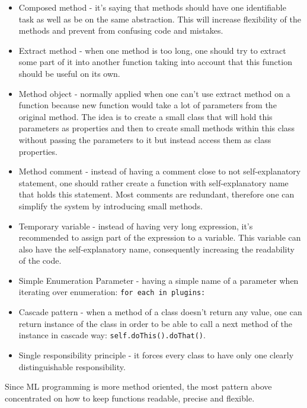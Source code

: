 {%
\begin{itemize}
	\item Composed method - it's saying that methods should
		have one identifiable task as well as be on the same abstraction.
		This will increase flexibility of the methods and prevent
		from confusing code and mistakes. \cite{beck1997smalltalk}
	\item Extract method - when one method is too long, one should try to
		extract some part of it into another function taking into account that this
		function should be useful on its own. \cite{1999:RID:311424}
	\item Method object -  normally applied when one can't use extract method
	 	on a function because new function would take a lot of parameters
		from the original method.
		The idea is to create a small class that will hold this parameters
		as properties and then to create small methods within this class without
		passing the parameters to it but instead access them as class properties.
		\cite{beck1997smalltalk}
	\item Method comment - instead of having a comment close to not
		self-explanatory statement, one should rather create a function
		with self-explanatory name that holds this statement.
		Most comments are redundant, therefore one can simplify
		the system by introducing small methods.
		\cite{beck1997smalltalk}
	\item Temporary variable - instead of having very long expression, it's recommended
		to assign part of the expression to a variable. This variable can also have
		the self-explanatory name, consequently increasing the readability of the code.\cite{beck1997smalltalk}
	\item Simple Enumeration Parameter - having a simple name of a parameter
		when iterating over enumeration: \lstinline{for each in plugins:} \cite{beck1997smalltalk}
	\item Cascade pattern - when a method of a class doesn't return any value,
		one can return instance of the class in order to be able to call a
		next method of the instance in cascade way: \lstinline{self.doThis().doThat()}.\cite{beck1997smalltalk}
	\item Single responsibility principle - it forces every class to have only one
		clearly distinguishable responsibility.\cite{martin2003agile}
\end{itemize}

Since ML programming is more method oriented, the most pattern above concentrated
on how to keep functions readable, precise and flexible.

}

